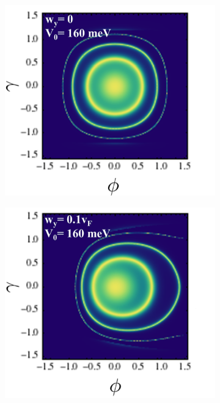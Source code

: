     \begin{figure}[H]
        \centering
        \begin{subfigure}[b]{0.4\linewidth}
            \includegraphics[width = \linewidth]{fig/Chap 2/anomalous1.png}
            \caption{}
            \label{2fig:anomalous1}
        \end{subfigure}
        \begin{subfigure}[b]{0.4\linewidth}
            \includegraphics[width = \linewidth]{fig/Chap 2/anomalous2.png}
            \caption{}
            \label{2fig:anomalous2}
        \end{subfigure}


\end{figure}
